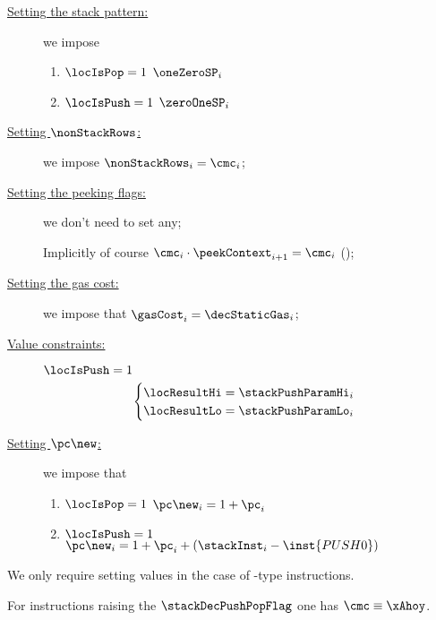 \begin{center}
\end{center}

\begin{description}
	\item[\underline{Setting the stack pattern:}] we impose
	\begin{enumerate}
		\item \If $\locIsPop  = 1$ \Then $\oneZeroSP_{i}$
		\item \If $\locIsPush = 1$ \Then $\zeroOneSP_{i}$
	\end{enumerate}
	\item[\underline{Setting $\nonStackRows$:}] we impose $\nonStackRows_{i} = \cmc_{i}$;
	\item[\underline{Setting the peeking flags:}] we don't need to set any;

	\saNote{} Implicitly of course $\cmc_{i} \cdot \peekContext_{i + 1} = \cmc_{i}$ (\trash);
	\item[\underline{Setting the gas cost:}] we impose that $\gasCost_{i} = \decStaticGas_{i}$;
	\item[\underline{Value constraints:}]
		 \If $\locIsPush = 1$ \Then
		\[
			\begin{cases}
				\locResultHi = \stackPushParamHi_{i} \\
				\locResultLo = \stackPushParamLo_{i} \\
			\end{cases}
		\]
	\item[\underline{Setting $\pc\new$:}]
		we impose that
		\begin{enumerate}
			\item \If $\locIsPop  = 1$ \Then $\pc\new_{i} = 1 + \pc_{i}$
			\item \If $\locIsPush = 1$ \Then $\pc\new_{i} = 1 + \pc_{i} + (\stackInst_{i} - \inst{PUSH0})$
		\end{enumerate}
\end{description}
\saNote{}
We only require setting values in the case of -type instructions.

\saNote{}
For instructions raising the $\stackDecPushPopFlag$ one has $\cmc \equiv \xAhoy$.
